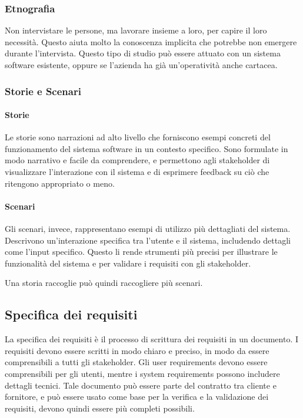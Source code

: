 \subsubsection{Etnografia}
Non intervistare le persone, ma lavorare insieme a loro, per capire il loro
necessità. Questo aiuta molto la conoscenza implicita che potrebbe non emergere 
durante l'intervista. Questo tipo di studio può essere attuato con un sistema software 
esistente, oppure se l'azienda ha già un'operatività anche cartacea.
\subsubsection{Storie e Scenari}

\paragraph{Storie} Le storie sono narrazioni ad alto livello che forniscono
esempi concreti del funzionamento del sistema software in un contesto specifico.
Sono formulate in modo narrativo e facile da comprendere, e permettono agli
stakeholder di visualizzare l'interazione con il sistema e di esprimere feedback
su ciò che ritengono appropriato o meno.

\paragraph{Scenari} Gli scenari, invece, rappresentano esempi di utilizzo
più dettagliati del sistema. Descrivono un'interazione specifica tra l'utente
e il sistema, includendo dettagli come l'input specifico. Questo li rende strumenti
più precisi per illustrare le funzionalità del sistema e per validare i requisiti
con gli stakeholder.


Una storia raccoglie può quindi raccogliere più scenari.
\subsection{Specifica dei requisiti}
La specifica dei requisiti è il processo di scrittura dei requisiti in un
documento. I requisiti devono essere scritti in modo chiaro e preciso, in modo
da essere comprensibili a tutti gli stakeholder. 
Gli user requirements devono essere comprensibili per gli utenti, mentre i system
requirements possono includere dettagli tecnici. Tale documento può essere 
parte del contratto tra cliente e fornitore, e può essere usato come base per
la verifica e la validazione dei requisiti, devono quindi essere più completi 
possibili.

